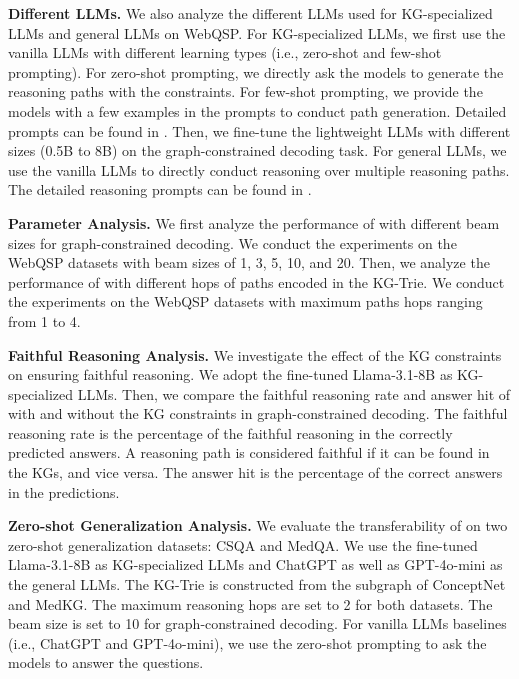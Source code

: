 \noindent\textbf{Different LLMs.} We also analyze the different LLMs used for KG-specialized LLMs and general LLMs on WebQSP. For KG-specialized LLMs, we first use the vanilla LLMs with different learning types (i.e., zero-shot and few-shot prompting). For zero-shot prompting, we directly ask the models to generate the reasoning paths with the constraints. For few-shot prompting, we provide the models with a few examples in the prompts to conduct path generation. Detailed prompts can be found in . Then, we fine-tune the lightweight LLMs with different sizes (0.5B to 8B) on the graph-constrained decoding task. For general LLMs, we use the vanilla LLMs to directly conduct reasoning over multiple reasoning paths. The detailed reasoning prompts can be found in .

\noindent\textbf{Parameter Analysis.} We first analyze the performance of \ourmethod with different beam sizes for graph-constrained decoding. We conduct the experiments on the WebQSP datasets with beam sizes of 1, 3, 5, 10, and 20. Then, we analyze the performance of \ourmethod with different hops of paths encoded in the KG-Trie. We conduct the experiments on the WebQSP datasets with maximum paths hops ranging from 1 to 4.

\noindent\textbf{Faithful Reasoning Analysis.} We investigate the effect of the KG constraints on ensuring faithful reasoning. We adopt the fine-tuned Llama-3.1-8B as KG-specialized LLMs. Then, we compare the faithful reasoning rate and answer hit of \ourmethod with and without the KG constraints in graph-constrained decoding. The faithful reasoning rate is the percentage of the faithful reasoning in the correctly predicted answers. A reasoning path is considered faithful if it can be found in the KGs, and vice versa. The answer hit is the percentage of the correct answers in the predictions.

\noindent\textbf{Zero-shot Generalization Analysis.} We evaluate the transferability of \ourmethod on two zero-shot generalization datasets: CSQA and MedQA. We use the fine-tuned Llama-3.1-8B as KG-specialized LLMs and ChatGPT as well as GPT-4o-mini as the general LLMs. The KG-Trie is constructed from the subgraph of ConceptNet and MedKG. The maximum reasoning hops are set to 2 for both datasets. The beam size is set to 10 for graph-constrained decoding. For vanilla LLMs baselines (i.e., ChatGPT and GPT-4o-mini), we use the zero-shot prompting to ask the models to answer the questions.


